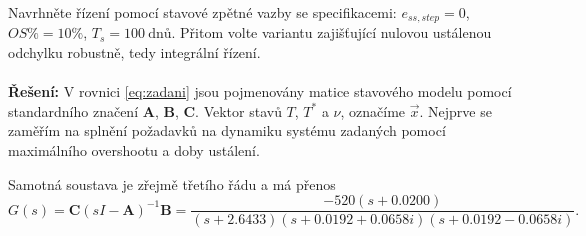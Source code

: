 \documentclass[twoside]{article}
\begin{document}
Navrhněte řízení pomocí stavové zpětné vazby se specifikacemi: $e_{ss,step} = 0$, $OS\% = 10\%$, $T_s = 100~\text{dnů}$.
Přitom volte variantu zajišťující nulovou ustálenou odchylku robustně, tedy integrální řízení. \\
\\
\textbf{Řešení:}
V rovnici \eqref{eq:zadani} jsou pojmenovány matice stavového modelu pomocí standardního značení $\mathbf{A}$, $\mathbf{B}$, $\mathbf{C}$.
Vektor stavů $T$, $T^{*}$ a $\nu$, označíme $\vec{x}$.
Nejprve se zaměřím na splnění požadavků na dynamiku systému zadaných pomocí maximálního overshootu a doby ustálení.

Samotná soustava je zřejmě třetího řádu a má přenos
\begin{equation}
	G(s) = \mathbf{C} (sI - \mathbf{A})^{-1} \mathbf{B} =  \frac{-520(s+0.0200)}{(s+2.6433)(s+0.0192+0.0658i)(s+0.0192-0.0658i)}.
\end{equation}
\end{document}
